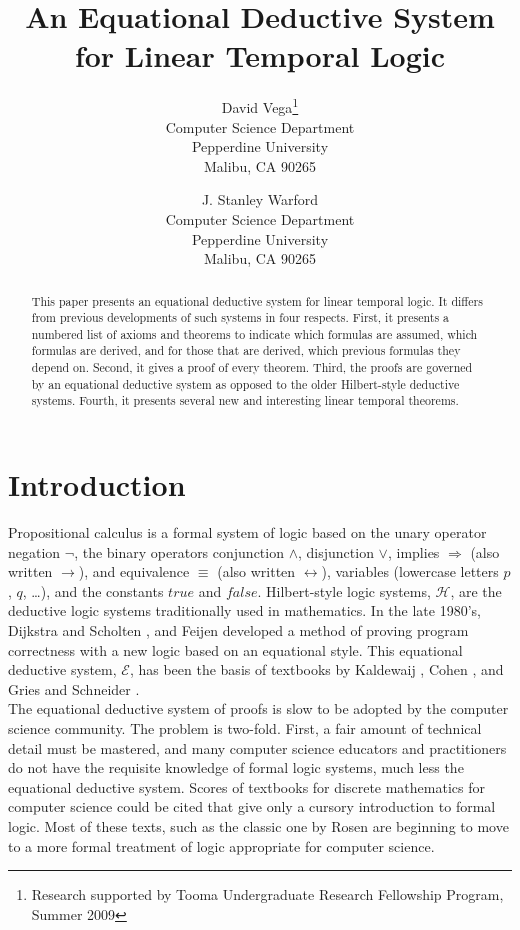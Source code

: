 \documentclass[fleqn, leqno]{article}
\title{An Equational Deductive System\\for Linear Temporal Logic}
\author{David Vega\thanks{Research supported by Tooma Undergraduate Research Fellowship Program, Summer 2009}\\
   Computer Science Department\\
   Pepperdine University\\
   Malibu, CA 90265
   \and
   J. Stanley Warford\\
   Computer Science Department\\
   Pepperdine University\\
   Malibu, CA 90265}
\date{} %
\newcommand{\impl}{\ensuremath{\Rightarrow}}        %
\begin{document}
\maketitle
\begin{abstract}
This paper presents an equational deductive system for linear temporal logic.
It differs from previous developments of such systems in four respects.
First, it presents a numbered list of axioms and theorems to indicate which formulas are assumed, which formulas are
derived, and for those that are derived, which previous formulas they depend on.
Second, it gives a proof of every theorem.
Third, the proofs are governed by an equational deductive system as opposed to the older Hilbert-style deductive systems.
Fourth, it presents several new and interesting linear temporal theorems.\end{abstract}

\thispagestyle{plain}

\section{Introduction}

Propositional calculus is a formal system of logic based on the unary operator negation $\lnot$,
the binary operators conjunction $\land$, disjunction $\lor$, implies $\impl$ (also written $\rightarrow$),
and equivalence $\equiv$ (also written $\leftrightarrow$),
variables (lowercase letters $p$, $q$, \dots), and the constants $true$ and $false$.
Hilbert-style logic systems, $\mathcal{H}$, are the deductive logic systems traditionally used in mathematics.
In the late 1980's, Dijkstra and Scholten \cite{DandS}, and Feijen \cite{Feij} developed a method of proving
program correctness with a new logic based on an equational style.
This equational deductive system, $\mathcal{E}$, has been the basis of textbooks by Kaldewaij \cite{Kald},
Cohen \cite{Cohen}, and Gries and Schneider \cite{LADM}.\\

The equational deductive system of proofs is slow to be adopted by the computer science community.
The problem is two-fold.
First, a fair amount of technical detail must be mastered,
and many computer science educators and practitioners do not have the requisite
knowledge of formal logic systems, much less the equational deductive system.
Scores of textbooks for discrete mathematics for computer science could be cited that give only a cursory introduction to
formal logic. Most of these texts, such as the classic one by Rosen \cite{Rosen} are beginning to move to a more
formal treatment of logic appropriate for computer science.\\
\end{document}
